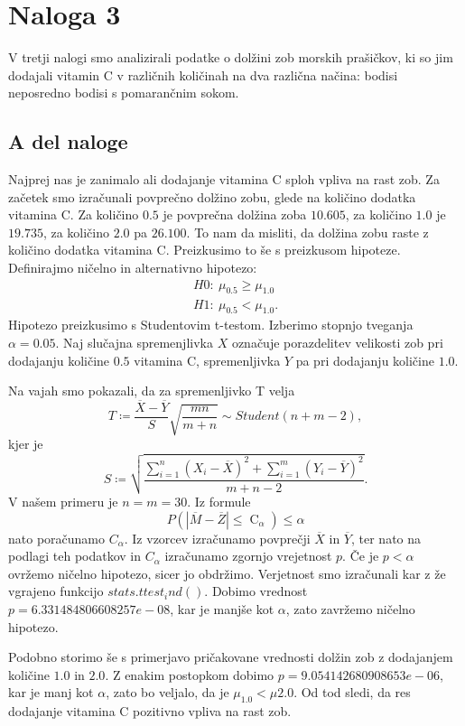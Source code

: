 \documentclass{article}
\DeclareMathOperator{\CM}{C}
\begin{document}
\section{Naloga 3}
V tretji nalogi smo analizirali
podatke o dolžini zob morskih prašičkov, ki so jim
dodajali vitamin C v različnih količinah na dva različna načina: bodisi neposredno
bodisi s pomarančnim sokom.

\subsection{A del naloge}
Najprej nas je zanimalo ali dodajanje vitamina C sploh vpliva na rast zob. Za začetek smo izračunali
povprečno dolžino zobu, glede na količino dodatka vitamina C. Za količino $0.5$ je povprečna dolžina zoba
$10.605$, za količino $1.0$ je $19.735$, za količino $2.0$ pa $26.100$. To nam da misliti, da dolžina zobu raste 
z količino dodatka vitamina C. Preizkusimo to še s preizkusom hipoteze. Definirajmo ničelno in alternativno
hipotezo:
\begin{align}
    H0: \ \mu_{0.5} \geq \mu_{1.0} \\
    H1: \ \mu_{0.5} < \mu_{1.0}.
\end{align}
Hipotezo preizkusimo s Studentovim t-testom. 
Izberimo stopnjo tveganja $\alpha=0.05$.
Naj slučajna spremenjlivka $X$ označuje porazdelitev velikosti zob pri dodajanju količine $0.5$ vitamina C,
spremenljivka $Y$ pa pri dodajanju količine $1.0$. 

Na vajah smo pokazali, da za spremenljivko T velja
    \[
        T \coloneqq \frac{\overline{X} - \overline{Y}}{S}\sqrt{\frac{mn}{m + n}} \sim Student(n + m - 2),
    \]
    kjer je
    \[
        S \coloneqq \sqrt{\frac{\sum_{i = 1}^n (X_{i} - \overline{X})^2 + \sum_{i = 1}^m (Y_{i} - \overline{Y})^2}{m + n - 2}}.
    \]
V našem primeru je $n=m=30$.
Iz formule
\[
        P(|\overline{M} - \overline{Z}| \leq \CM_{\alpha}) \leq \alpha 
    \]
nato poračunamo $C_{\alpha}$. Iz vzorcev izračunamo povprečji $\overline{X}$ in $\overline{Y}$, ter nato 
na podlagi teh podatkov in $C_{\alpha}$ izračunamo zgornjo vrejetnost $p$. Če je $p < \alpha$ ovržemo
ničelno hipotezo, sicer jo obdržimo. 
Verjetnost smo izračunali kar z že vgrajeno funkcijo $stats.ttest_ind()$. 
Dobimo vrednost $p = 6.331484806608257e-08$,
kar je manjše kot $\alpha$, zato zavržemo ničelno hipotezo. 

Podobno storimo še s primerjavo pričakovane vrednosti dolžin zob z dodajanjem količine $1.0$ in $2.0$.
Z enakim postopkom dobimo $p=9.054142680908653e-06$, kar je manj kot $\alpha$, zato bo veljalo, da je 
$\mu_{1.0} < \mu{2.0}$. Od tod sledi, da res dodajanje vitamina C pozitivno vpliva na rast zob.
\end{document}
